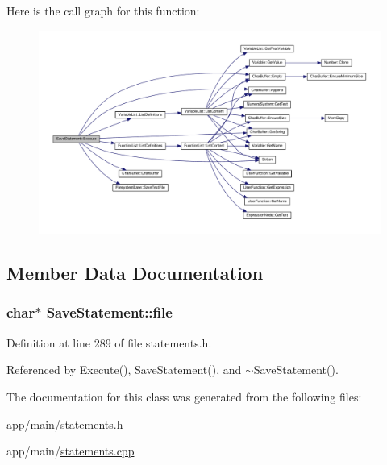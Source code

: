 Here is the call graph for this function\+:
\nopagebreak
\begin{figure}[H]
\begin{center}
\leavevmode
\includegraphics[width=350pt]{da/d7d/classSaveStatement_ae94aa8533f620634f97b2835cee1eaa2_cgraph}
\end{center}
\end{figure}




\subsection{Member Data Documentation}
\subsubsection[{\texorpdfstring{file}{file}}]{\setlength{\rightskip}{0pt plus 5cm}char$\ast$ Save\+Statement\+::file\hspace{0.3cm}{\ttfamily [private]}}\hypertarget{classSaveStatement_ad14404fce25b061b62b9b4d9e6e1b830}{}\label{classSaveStatement_ad14404fce25b061b62b9b4d9e6e1b830}


Definition at line 289 of file statements.\+h.



Referenced by Execute(), Save\+Statement(), and $\sim$\+Save\+Statement().



The documentation for this class was generated from the following files\+:\begin{DoxyCompactItemize}
\item 
app/main/\hyperlink{statements_8h}{statements.\+h}\item 
app/main/\hyperlink{statements_8cpp}{statements.\+cpp}\end{DoxyCompactItemize}
